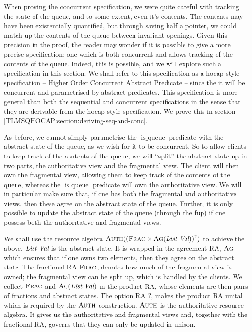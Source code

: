 \documentclass[a4paper, 10pt]{report}
\theoremstyle{definition}
\newcommand{\isqueue}{\operatorname{is\_queue}}
\begin{document}
When proving the concurrent specification, we were quite careful with tracking the state of the queue, and to some extent, even it's contents. The contents may have been existentially quantified, but through saving half a pointer, we could match up the contents of the queue between invariant openings. Given this precision in the proof, the reader may wonder if it is possible to give a more precise specification: one which is both concurrent and allows tracking of the contents of the queue. Indeed, this is possible, and we will explore such a specification in this section. We shall refer to this specification as a hocap-style specification -- Higher Order Concurrent Abstract Predicate -- since the it will be concurrent and parametrised by abstract predicates. This specification is more general than both the sequential and concurrent specifications in the sense that they are derivable from the hocap-style specification. We prove this in section \ref{TLMSQHOCAP:section:deriving-seq-and-conc}.

As before, we cannot simply parametrise the $\isqueue$ predicate with the abstract state of the queue, as we wish for it to be concurrent. So to allow clients to keep track of the contents of the queue, we will ``split'' the abstract state up in two parts, the authoritative view and the fragmental view. The client will then own the fragmental view, allowing them to keep track of the contents of the queue, whereas the $\isqueue$ predicate will own the authoritative view. We will in particular make sure that, if one has both the fragmental and authoritative views, then these agree on the abstract state of the queue. Further, it is only possible to update the abstract state of the queue (through the fup) if one possess both the authoritative and fragmental views.

We shall use the resource algebra $\textsc{Auth}((\textsc{Frac} \times \textsc{Ag}(\textit{List} ~ \textit{Val}))^?)$ to achieve the above. $\textit{List} ~ \textit{Val}$ is the abstract state. It is wrapped in the agreement RA, $\textsc{Ag}$, which ensures that if one owns two elements, then they agree on the abstract state. The fractional RA $\textsc{Frac}$, denotes how much of the fragmental view is owned; the fragmental view can be split up, which is handled by the clients. We collect $\textsc{Frac}$ and $\textsc{Ag}(\textit{List} ~ \textit{Val})$ in the product RA, whose elements are then pairs of fractions and abstract states.
The option RA $?$, makes the product RA unital which is required by the $\textsc{Auth}$ construction. $\textsc{Auth}$ is the authoritative resource algebra. It gives us the authoritative and fragmental views and, together with the fractional RA, governs that they can only be updated in unison.
\end{document}
